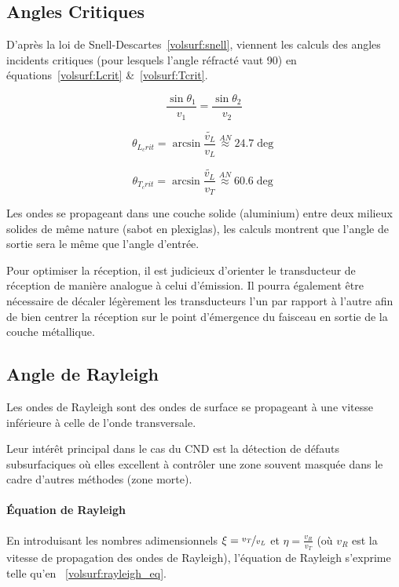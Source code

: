 \subsection{Angles Critiques}

D'après la loi de Snell-Descartes~\eqref{volsurf:snell}, viennent les calculs des angles incidents critiques (pour lesquels l'angle réfracté vaut 90\degre) en équations~\eqref{volsurf:Lcrit} &~\eqref{volsurf:Tcrit}.

\begin{equation}
    \frac{\sin \theta_1}{v_1} = \frac{\sin\theta_2}{v_2} \label{volsurf:snell}
\end{equation}

\begin{equation}
    \theta_{L_crit} = \arcsin\frac{\tilde{v_L}}{v_L} \overset{AN}{\approx} 24.7\deg \label{volsurf:Lcrit}
\end{equation}

\begin{equation}
    \theta_{T_crit} = \arcsin\frac{\tilde{v_L}}{v_T} \overset{AN}{\approx} 60.6\deg \label{volsurf:Tcrit}
\end{equation}

Les ondes se propageant dans une couche solide (aluminium) entre deux milieux solides de même nature (sabot en plexiglas), les calculs montrent que l'angle de sortie sera le même que l'angle d'entrée.

Pour optimiser la réception, il est judicieux d'orienter le transducteur de réception de manière analogue à celui d'émission. Il pourra également être nécessaire de décaler légèrement les transducteurs l'un par rapport à l'autre afin de bien centrer la réception sur le point d'émergence du faisceau en sortie de la couche métallique.

\subsection{Angle de Rayleigh}
\label{volsurf:theo:rayleigh_angle}

Les ondes de Rayleigh sont des ondes de surface se propageant à une vitesse inférieure à celle de l'onde transversale. 

Leur intérêt principal dans le cas du CND est la détection de défauts subsurfaciques où elles excellent à contrôler une zone souvent masquée dans le cadre d'autres méthodes (zone morte).

\paragraph{Équation de Rayleigh} En introduisant les nombres adimensionnels $\xi = \nicefrac{v_T}{v_L}$ et $\eta = \frac{v_R}{v_T}$ (où $v_R$ est la vitesse de propagation des ondes de Rayleigh), l'équation de Rayleigh s'exprime telle qu'en ~\eqref{volsurf:rayleigh_eq}.

